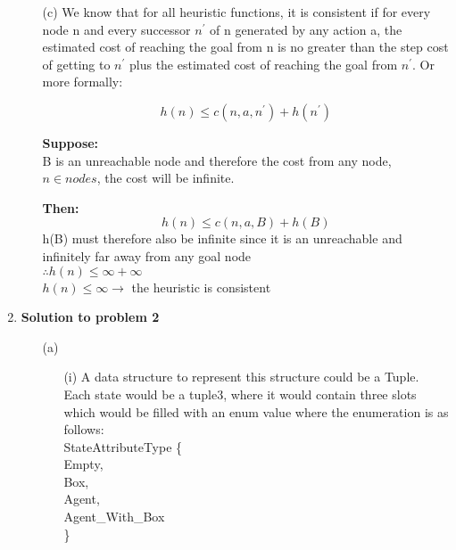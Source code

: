 \begin{enumerate}
\begin{enumerate}
\begin{enumerate}
			\end{enumerate}
			\item[(c)] We know that for all heuristic functions, it is consistent if for every node n and every successor \(n^{\prime} \) of n  generated by any action a, the estimated cost of reaching the goal from n is no greater than the step cost of getting to \(n^{\prime} \) plus the estimated cost of reaching the goal from \(n^{\prime} \).  Or more formally: 
			
			\[ 
				h(n) \le c(n,a,n^\prime) + h(n^\prime) 
			\]
			
			\textbf{Suppose:}  \\
			B is an unreachable node and therefore the cost from any node, \(n \in nodes\), the cost will be infinite.
			
			\textbf{Then:} \\
			\[ h(n) \le c(n,a,B) + h(B) \]
			h(B) must therefore also be infinite since it is an unreachable and infinitely far away from any goal node \\
			
			\(\therefore h(n) \le \infty + \infty \) \\
			\hspace*{3 mm} \( h(n) \le \infty \rightarrow  \)  the heuristic is consistent
		\end{enumerate}
			
 	\item {\bf Solution to problem 2}
	
		\begin{enumerate}
			\item[(a)]
				\begin{enumerate}
					\item[(i)] A data structure to represent this structure could be a Tuple. Each state would be a tuple3, where it would contain three slots which would be filled with an enum value where the enumeration is as follows:\\
					
						StateAttributeType \{ \\
						\hspace*{4mm} Empty, \\
						\hspace*{4mm} Box, \\
						\hspace*{4mm} Agent, \\ 
						\hspace*{4mm} Agent\_With\_Box \\
						\} \\
						

\end{enumerate}
\end{enumerate}
\end{enumerate}
